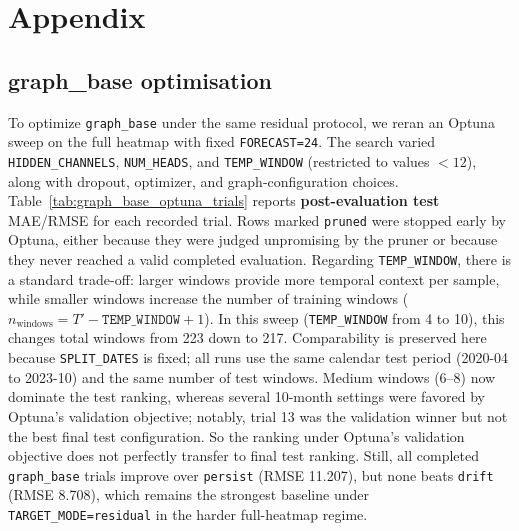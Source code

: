 \documentclass{article}
\begin{document}
\appendix
\section{Appendix}


\subsection{graph\_base optimisation}
To optimize \texttt{graph\_base} under the same residual protocol, we reran an Optuna sweep on the
full heatmap with fixed \texttt{FORECAST=24}.
The search varied \texttt{HIDDEN\_CHANNELS}, \texttt{NUM\_HEADS}, and \texttt{TEMP\_WINDOW}
(restricted to values $<12$), along with dropout, optimizer, and graph-configuration choices.
Table~\ref{tab:graph_base_optuna_trials} reports
\textbf{post-evaluation test} MAE/RMSE for each recorded trial.
Rows marked \texttt{pruned} were stopped early by Optuna, either because they were judged unpromising
by the pruner or because they never reached a valid completed evaluation.
\newline
Regarding \texttt{TEMP\_WINDOW}, there is a standard trade-off: larger windows provide more temporal context per sample,
while smaller windows increase the number of training windows (\(n_{\text{windows}} = T' - \texttt{TEMP\_WINDOW} + 1\)).
In this sweep (\texttt{TEMP\_WINDOW} from 4 to 10), this changes total windows from 223 down to 217.
Comparability is preserved here because \texttt{SPLIT\_DATES} is fixed; all runs use the same calendar test period
(2020-04 to 2023-10) and the same number of test windows.
Medium windows (6--8) now dominate the test ranking, whereas several 10-month settings were favored by
Optuna's validation objective; notably, trial 13 was the validation winner but not the best final test
configuration. So the ranking under Optuna's validation objective does not perfectly transfer to final test ranking.
Still, all completed \texttt{graph\_base} trials improve over \texttt{persist} (RMSE 11.207), but none beats
\texttt{drift} (RMSE 8.708), which remains the strongest baseline under \texttt{TARGET\_MODE=residual} in the
harder full-heatmap regime.
\end{document}
